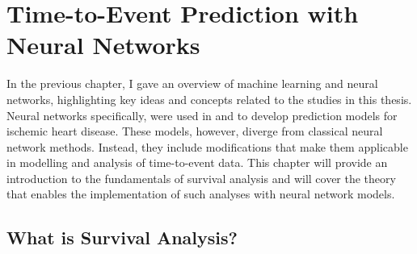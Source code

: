 \chapter{Time-to-Event Prediction with Neural Networks}
\label{survival-analysis}


In the previous chapter, 
I gave an overview of machine learning and neural networks,
highlighting key ideas and concepts related to the studies in this thesis.
Neural networks specifically, 
were used in \studyii{} and \studyiii{} to develop
prediction models for ischemic heart disease.
These models, however, diverge from classical neural network methods.
Instead, they include modifications that make them applicable
in modelling and analysis of time-to-event data.
This chapter will provide an introduction to the fundamentals
of survival analysis and will cover the
theory that enables the implementation of such analyses with
neural network models.

\section{What is Survival Analysis?}

